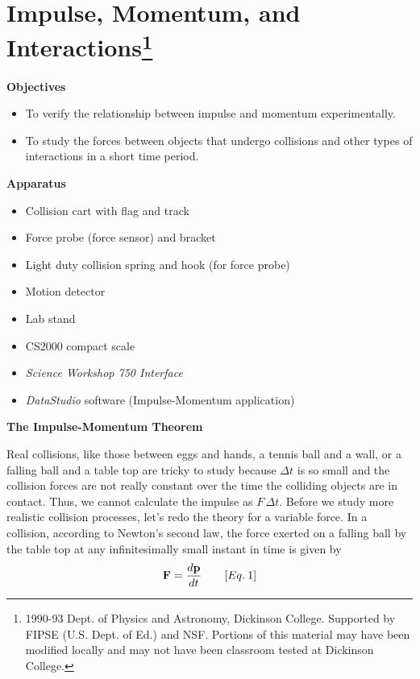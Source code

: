 
\section{Impulse, Momentum, and Interactions\footnote{
1990-93 Dept. of Physics and Astronomy, Dickinson College. Supported by FIPSE
(U.S. Dept. of Ed.) and NSF. Portions of this material may have been modified
locally and may not have been classroom tested at Dickinson College.
}}

\makelabheader %

\textbf{Objectives }

\begin{itemize}
\item To verify the relationship between impulse and momentum experimentally. 
\item To study the forces between objects that undergo collisions and other types of interactions in a short time period.
\end{itemize}
\textbf{Apparatus} 

\begin{itemize}
\item Collision cart with flag and track 
\item Force probe (force sensor) and bracket
\item Light duty collision spring and hook (for force probe)
\item Motion detector
\item Lab stand
\item CS2000 compact scale
\item \textit{Science Workshop 750 Interface}
\item \textit{DataStudio} software (Impulse-Momentum application)
\end{itemize}
\textbf{The Impulse-Momentum Theorem }

Real collisions, like those between eggs and hands, a tennis ball and a wall, or
a falling ball and a table top are tricky to study because $\Delta t$ 
is so small and
the collision forces are not really constant over the time the colliding objects
are in contact. Thus, we cannot calculate the impulse as $F \,\Delta t$. 
Before we study
more realistic collision processes, let's redo the theory for a variable force.
In a collision, according to Newton's second law, the force exerted on a falling
ball by the table top at any infinitesimally small instant in time is given
by
\[
{\bf F}=\frac{d{\bf p}}{dt}\qquad [Eq.\: 1]\]


